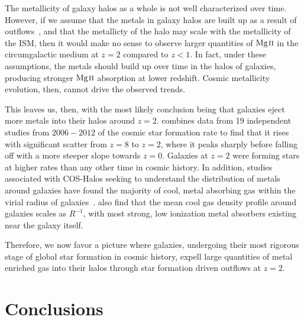 \documentclass[iop,apj,numberedappendix,appendixfloats,twocolappendix]{emulateapj}
\begin{document}
The metallicity of galaxy halos as a whole is not well characterized over time. However, if we assume that the metals in galaxy halos are built up as a result of outflows~\citep{Quiret2016}, and that the metallicty of the halo may scale with the metallicity of the ISM, then it would make no sense to observe larger quantities of ${\hbox{{\rm Mg}\kern 0.1em{\sc ii}}}$ in the circumgalactic medium at $z = 2$ compared to $z < 1$. In fact, under these assumptions, the metals should build up over time in the halos of galaxies, producing stronger ${\hbox{{\rm Mg}\kern 0.1em{\sc ii}}}$ absorption at lower redshift. Cosmic metallicity evolution, then, cannot drive the observed trends.

This leaves us, then, with the most likely conclusion being that galaxies eject more metals into their halos around $z = 2$. \cite{Behroozi2013sfr} combines data from 19 independent studies from $2006-2012$ of the cosmic star formation rate to find that it rises with significant scatter from $z=8$ to $z=2$, where it peaks sharply before falling off with a more steeper slope towards $z = 0$. Galaxies at $z=2$ were forming stars at higher rates than any other time in cosmic history. In addition, studies associated with COS-Halos seeking to understand the distribution of metals around galaxies have found the majority of cool, metal absorbing gas within the virial radius of galaxies~\citep{Peeples2014}. \cite{Stern2016} also find that the mean cool gas density profile around galaxies scales as $R^{-1}$, with most strong, low ionization metal absorbers existing near the galaxy itself. 

Therefore, we now favor a picture where galaxies, undergoing their most rigorous stage of global star formation in cosmic history, expell large quantities of metal enriched gas into their halos through star formation driven outflows at $z = 2$. 


\section{Conclusions}
\label{sec:conclusions}
\end{document}
